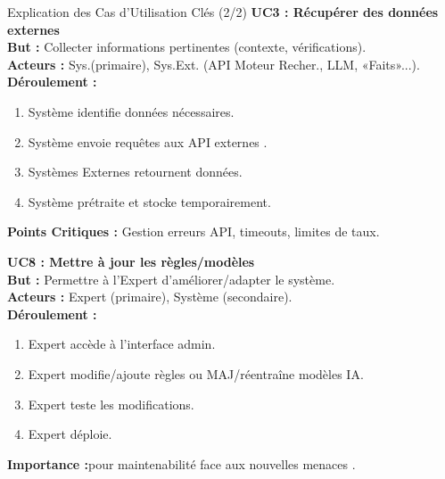 \documentclass[9pt]{beamer}
\begin{document}
\begin{frame}{Explication des Cas d'Utilisation Clés (2/2)}
  \textbf{UC3 : Récupérer des données externes} \\ %
  \textbf{But :} Collecter informations pertinentes (contexte, vérifications). \\
  \textbf{Acteurs :} Sys.(primaire), Sys.Ext. (API Moteur Recher., LLM, «Faits»...). \\
  \textbf{Déroulement :}
  \begin{enumerate}
    \item Système identifie données nécessaires.
    \item Système envoie requêtes aux API externes \citet{GoogleSearchAPI, Google2026Fact}. %
    \item Systèmes Externes retournent données.
    \item Système prétraite et stocke temporairement.
  \end{enumerate}
  \textbf{Points Critiques :} Gestion erreurs API, timeouts, limites de taux. %

  \medskip %

  \textbf{UC8 : Mettre à jour les règles/modèles} \\ %
  \textbf{But :} Permettre à l'Expert d'améliorer/adapter le système. \\
  \textbf{Acteurs :} Expert (primaire), Système (secondaire). \\
  \textbf{Déroulement :}
  \begin{enumerate}
    \item Expert accède à l'interface admin.
    \item Expert modifie/ajoute règles ou MAJ/réentraîne modèles IA.
    \item Expert teste les modifications.
    \item Expert déploie.
  \end{enumerate}
   \textbf{Importance :}pour maintenabilité face aux nouvelles menaces \citet{Nabozny2021, Loth2024, Chen2024Combating}. %

\end{frame}

\end{document}
